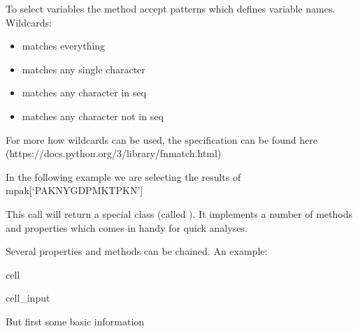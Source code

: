 \documentclass[letterpaper,10pt,english]{jupyterBook}
\begin{document}
\sphinxAtStartPar
To select variables the method accept patterns which defines variable names. Wildcards:
\begin{itemize}
\item {} 
\sphinxAtStartPar
\sphinxcode{\sphinxupquote{\textbackslash{}*}} matches everything

\item {} 
\sphinxAtStartPar
{} matches any single character

\item {} 
\sphinxAtStartPar
\sphinxcode{\sphinxupquote{\textbackslash{}{[}seq{]}}} matches any character in seq

\item {} 
\sphinxAtStartPar
\sphinxcode{\sphinxupquote{\textbackslash{}{[}!seq{]}}} matches any character not in seq

\end{itemize}

\sphinxAtStartPar
For more how wildcards can be used, the specification can be found here (https://docs.python.org/3/library/fnmatch.html)

\sphinxAtStartPar
In the following example we are selecting the results of mpak{[}‘PAKNYGDPMKTPKN’{]}

\sphinxAtStartPar
This call will return a special class (called ). It implements a number
of methods and properties which comes in handy for quick analyses.

\sphinxAtStartPar
Several properties and methods can be chained. An example:

\begin{sphinxuseclass}{cell}\begin{sphinxVerbatimInput}

\begin{sphinxuseclass}{cell_input}
\begin{sphinxVerbatim}[commandchars=\\\{\}]
 
    \PYG{p}{[}\PYG{p}{]}
\end{sphinxVerbatim}

\end{sphinxuseclass}\end{sphinxVerbatimInput}

\end{sphinxuseclass}
\sphinxAtStartPar
But first some basic information
\end{document}
